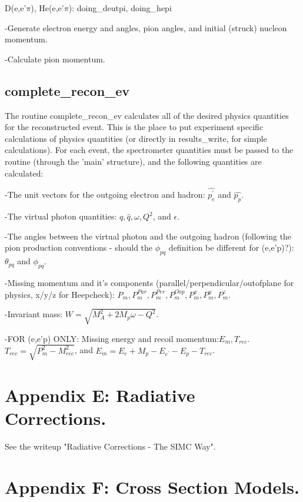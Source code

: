 D(e,e'$\pi$), He(e,e'$\pi$): doing\_deutpi, doing\_hepi

-Generate electron energy and angles, pion angles, and initial (struck)
nucleon momentum.

-Calculate pion momentum.

\subsection{complete\_recon\_ev}

The routine complete\_recon\_ev calculates all of the desired physics
quantities for the reconstructed event.  This is the place to put
experiment specific calculations of physics quantities (or directly in
results\_write, for simple calculations).  For each event, the spectrometer
quantities must be passed to the routine (through the 'main' structure), and
the following quantities are calculated:

-The unit vectors for the outgoing electron and hadron: $\hat{p_e^\prime}$
and $\hat{p_p}$.

-The virtual photon quantities: $q, \hat{q}, \omega, Q^2$, and $\epsilon$.

-The angles between the virtual photon and the outgoing hadron (following
the pion production conventions - should the $\phi_{pq}$ definition be
different for (e,e'p)?): $\theta_{pq}$ and $\phi_{pq}$.

-Missing momentum and it's components (parallel/perpendicular/outofplane for
physics, x/y/z for Heepcheck): $P_m, P_m^{Par}, P_m^{Per}, P_m^{Oop},
 P_m^{x}, P_m^{y}, P_m^{z}$.

-Invariant mass: $W = \sqrt{M_A^2 + 2 M_p \omega - Q^2}$.

-FOR (e,e'p) ONLY: Missing energy and recoil momentum:$E_m, T_{rec}$.
$T_{rec} = \sqrt{ P_m^2 - M_{rec}^2 }$, and
$E_m = E_e + M_p - E_{e^\prime} - E_p - T_{rec}$.

\section{Appendix E: Radiative Corrections.}

See the writeup "Radiative Corrections - The SIMC Way"\cite{ddrad}.



\section{Appendix F: Cross Section Models.}

